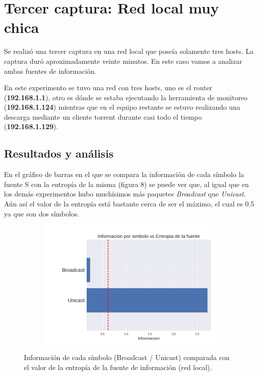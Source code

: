 \section{Tercer captura: Red local muy chica}

\par Se realizó una tercer captura en una red local que poseía solamente tres hosts. La captura duró aproximadamente veinte minutos. En este caso vamos a analizar ambas fuentes de información.
\par En este experimento se tuvo una red con tres hosts, uno es el router (\textbf{192.168.1.1}), otro es dónde se estaba ejecutando la herramienta de monitoreo (\textbf{192.168.1.124}) mientras que en el equipo restante se estuvo realizando una descarga mediante un cliente torrent durante casi todo el tiempo (\textbf{192.168.1.129}).

\subsection{Resultados y análisis}

\par En el gráfico de barras en el que se compara la información de cada símbolo la fuente S con la entropía de la misma (figura 8) se puede ver que, al igual que en los demás experimentos hubo muchísimos más paquetes \textit{Broadcast} que \textit{Unicast}. Aún así el valor de la entropía está bastante cerca de ser el máximo, el cual es 0.5 ya que son dos símbolos.

\begin{figure}[h]
  \begin{subfigure}{.5\textwidth}
    \includegraphics[width=\textwidth]{imagenes/mini_red/mini_red_unicastvsbroadcast.png}
  \end{subfigure}
  \label{fig:exp3_univsbr_infovsentro}
  \caption{Información de cada símbolo (Broadcast / Unicast) comparada con el valor de la entropía de la fuente de información (red local).}
\end{figure}


